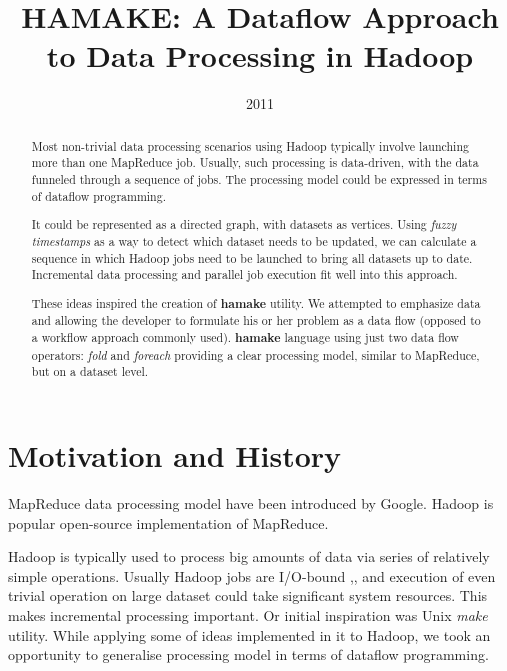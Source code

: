 \documentclass[10pt,conference,letterpaper]{IEEEtran}
\title{HAMAKE: A Dataflow Approach to Data Processing in Hadoop}
\author{\IEEEauthorblockN{Vadim Zaliva}
\IEEEauthorblockA{Codeminders\\
Email: lord@crocodile.org} \and \IEEEauthorblockN{Vladimir Orlov}
\IEEEauthorblockA{Codeminders\\
Email: vorl@codeminders.com}}
\date{2011}
\begin{document}
\lstset{language=XML,basicstyle=\tiny,markfirstintag=true,numbers=left,numbersep=1pt}

\maketitle

\begin{abstract}
  Most non-trivial data processing scenarios using Hadoop typically
  involve launching more than one MapReduce job. Usually, such
  processing is data-driven, with the data funneled through a sequence
  of jobs. The processing model could be expressed in terms of
  dataflow programming.
  
  It could be represented as a directed graph, with datasets as
  vertices. Using \textit{fuzzy timestamps} as a way to detect which
  dataset needs to be updated, we can calculate a sequence in which
  Hadoop jobs need to be launched to bring all datasets up to
  date. Incremental data processing and parallel job execution fit
  well into this approach.

  These ideas inspired the creation of \textbf{hamake} utility. We
  attempted to emphasize data and allowing the developer to formulate
  his or her problem as a data flow (opposed to a workflow approach
  commonly used). \textbf{hamake} language using just two data flow
  operators: \emph{fold} and \emph{foreach} providing a clear
  processing model, similar to MapReduce, but on a dataset level.
\end{abstract}

\section{Motivation and History}

MapReduce data processing model have been introduced by
Google\cite{dean2008map}. Hadoop\cite{bialecki2005hadoop} is popular
open-source implementation of MapReduce.

Hadoop is typically used to process big amounts of data via series of
relatively simple operations. Usually Hadoop jobs are I/O-bound
\cite{hadoopattwitter},\cite{hs2010hadoopbench}, and execution of even
trivial operation on large dataset could take significant system
resources. This makes incremental processing important. Or initial
inspiration was Unix \emph{make} utility. While applying some of ideas
implemented in it to Hadoop, we took an opportunity to generalise
processing model in terms of dataflow programming.
\end{document}
